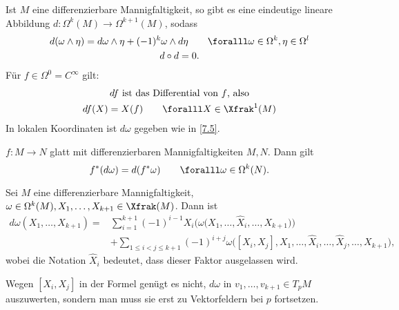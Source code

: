 \begin{thm}\label{7.7}
	Ist $M$ eine differenzierbare Mannigfaltigkeit, so gibt es eine eindeutige lineare Abbildung $ d: \Omega^k(M) \to \Omega^{k+1}(M) $, sodass
	\begin{gather*}
		d(\omega \wedge \eta) = d\omega \wedge \eta + (-1)^k \omega \wedge d \eta \qquad \foralll \omega \in \Omega^k, \eta \in \Omega^l\\
		d \circ d = 0.
	\end{gather*}
	Für $ f \in \Omega^0 = C^\infty $ gilt:
	\begin{gather*}
		df \ \text{ist das Differential von $f$, also}\\
		df(X) = X(f) \qquad \foralll X \in \Xfrak^1(M)
	\end{gather*}
	In lokalen Koordinaten ist $d\omega$ gegeben wie in \ref{7.5}.
\end{thm}

\begin{lem}
	$ f: M \to N $ glatt mit differenzierbaren Mannigfaltigkeiten $M,N$. Dann gilt
	\[ f^*(d\omega) = d(f^*\omega) \qquad \foralll \omega \in \Omega^k(N). \]
\end{lem}

\begin{lem}
	Sei $M$ eine differenzierbare Mannigfaltigkeit, $\omega \in \Omega^k(M), X_1, \dotsc, X_{k+1} \in \Xfrak(M)$. Dann ist
	\begin{align*}
		d\omega (X_1, \dots, X_{k+1}) =& \sum_{i=1}^{k+1} (-1)^{i-1} X_i \Big( \omega \big(X_1, \dotsc, \hat{X}_i, \dotsc, X_{k+1}\big) \Big) \\
			&+ \sum_{1 \leq i < j \leq k+1} (-1)^{i+j} \omega \big([X_i,X_j], X_1, \dotsc, \hat{X}_i, \dotsc, \hat{X}_j, \dotsc, X_{k+1} \big),
	\end{align*}
	wobei die Notation $\hat{X}_i$ bedeutet, dass dieser Faktor ausgelassen wird.
\end{lem}

\begin{rem*}
	Wegen $ [X_i,X_j] $ in der Formel genügt es nicht, $d\omega$ in $v_1, \dotsc, v_{k+1} \in T_pM$ auszuwerten, sondern man muss sie erst zu Vektorfeldern bei $p$ fortsetzen.
\end{rem*}


